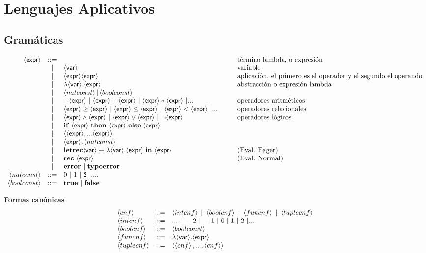 \section{Lenguajes Aplicativos}
  \subsection{Gramáticas}
    \[\begin{array}{rcl@{\hspace{1cm}}l}
      \expr &::= && \text{término lambda, o expresión} \\
          &|& \var & \text{variable} \\
          &|& \expr \expr & \text{aplicación, el primero es el operador y el segundo el operando} \\
          &|& \lambda \var.\expr & \text{abstracción o expresión lambda} \\
          &|& \natconst | \boolconst \\
          &|& -\expr \ |\ \expr + \expr  \ |\ \expr * \expr \ |... & \text{operadores aritméticos}\\
          &|& \expr\geq \expr  \ |\ \expr\leq \expr \ |\ \expr< \expr \ | ... & \text{operadores relacionales}\\
          &|& \expr\wedge \expr  \ |\ \expr\vee \expr \ |\ \neg\expr & \text{operadores lógicos} \\
          &|& \ife \expr\thene \expr\elsee \expr \\
          &|& \la \expr, ... \expr \ra \\
          &|& \expr . \natconst \\
          &|& \textbf{letrec}\var \equiv \lambda \var.\expr\ \textbf{in}\ \expr&\text{(Eval. Eager)} \\
          &|& \textbf{rec}\ \expr& \text{(Eval. Normal)} \\
          &|& \textbf{error}\ |\ \textbf{typeerror} \\
          \natconst & ::= & 0\ |\ 1\ |\ 2\ | .... \\
          \boolconst & ::= & \textbf{true}\ | \ \textbf{false}
    \end{array}\]

    \textbf{Formas canónicas}
    \[
      \begin{array}{llllll}
      \cnf & ::= & \intcnf\  |\  \boolcnf\ |\ \funcnf \ | \tuplecnf \\
      \intcnf & ::= & ...\ | \ -2\ | \ -1\ | \ 0\ |\ 1\ |\ 2\ | ... \\
      \boolcnf & ::= & \boolconst \\
      \funcnf & ::= & \lambda \var.\expr \\
      \tuplecnf & ::= & \la \la cnf \ra, ..., \la cnf \ra \ra
      \end{array}
    \]
  
